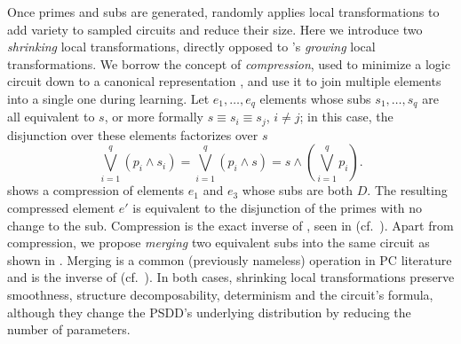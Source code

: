 Once primes and subs are generated,  randomly applies local transformations to
add variety to sampled circuits and reduce their size. Here we introduce two \emph{shrinking} local
transformations, directly opposed to \incrclass{}'s \emph{growing} local transformations. We borrow
the concept of \emph{compression}, used to minimize a logic circuit down to a canonical
representation \citep{darwiche11}, and use it to join multiple elements into a single one during
learning. Let $e_1,\ldots,e_q$ elements whose subs $s_1,\ldots,s_q$ are all equivalent to $s$, or
more formally $s\equiv s_i\equiv s_j$, $i\neq j$; in this case, the disjunction over these elements
factorizes over $s$
\begin{equation*}
  \bigvee_{i=1}^q (p_i\wedge s_i)=\bigvee_{i=1}^q (p_i\wedge s)=s\wedge\left(\bigvee_{i=1}^q p_i\right).
\end{equation*}
 shows a compression of elements $e_1$ and $e_3$ whose subs are both $D$. The
resulting compressed element $e'$ is equivalent to the disjunction of the primes with no change to
the sub. Compression is the exact inverse of , seen in  (cf.\
). Apart from compression, we propose \emph{merging} two equivalent subs into
the same circuit as shown in \Cref{fig:merge}. Merging is a common (previously nameless) operation
in PC literature and is the inverse of \textproc{Clone} (cf.\ \Cref{fig:splitclone}). In both
cases, shrinking local transformations preserve smoothness, structure decomposability, determinism
and the circuit's formula, although they change the PSDD's underlying distribution by reducing the
number of parameters.

